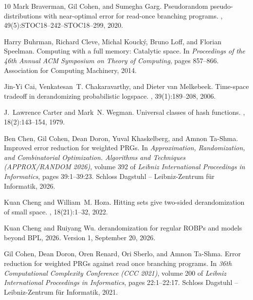 \documentclass[11pt]{article}
\numberwithin{equation}{section}
\theoremstyle{definition}
\theoremstyle{remark}
\begin{document}
\begin{thebibliography}{10}
Mark Braverman, Gil Cohen, and Sumegha Garg.
\newblock Pseudorandom pseudo-distributions with near-optimal error for
  read-once branching programs.
, 49(5):STOC18--242--STOC18--299,
  2020.

Harry Buhrman, Richard Cleve, Michal Kouck{\'y}, Bruno Loff, and Florian
  Speelman.
\newblock Computing with a full memory: Catalytic space.
\newblock In {\em Proceedings of the 46th Annual ACM Symposium on Theory of
  Computing}, pages 857--866. Association for Computing Machinery, 2014.

Jin-Yi Cai, Venkatesan~T. Chakaravarthy, and Dieter van Melkebeek.
\newblock Time-space tradeoff in derandomizing probabilistic logspace.
, 39(1):189--208, 2006.

J.~Lawrence Carter and Mark~N. Wegman.
\newblock Universal classes of hash functions.
, 18(2):143--154, 1979.

Ben Chen, Gil Cohen, Dean Doron, Yuval Khaskelberg, and Amnon Ta-Shma.
\newblock Improved error reduction for weighted {PRGs}.
\newblock In {\em Approximation, Randomization, and Combinatorial Optimization.
  Algorithms and Techniques (APPROX/RANDOM 2026)}, volume 392 of {\em Leibniz
  International Proceedings in Informatics}, pages 39:1--39:23. Schloss
  Dagstuhl -- Leibniz-Zentrum f{\"u}r Informatik, 2026.

Kuan Cheng and William~M. Hoza.
\newblock Hitting sets give two-sided derandomization of small space.
, 18(21):1--32, 2022.

Kuan Cheng and Ruiyang Wu.
 derandomization for regular {ROBPs} and models beyond {BPL},
  2026.
\newblock Version 1, September 20, 2026.

Gil Cohen, Dean Doron, Oren Renard, Ori Sberlo, and Amnon Ta-Shma.
\newblock Error reduction for weighted {PRGs} against read once branching
  programs.
\newblock In {\em 36th Computational Complexity Conference (CCC 2021)}, volume
  200 of {\em Leibniz International Proceedings in Informatics}, pages
  22:1--22:17. Schloss Dagstuhl -- Leibniz-Zentrum f{\"u}r Informatik, 2021.


\end{thebibliography}
\end{document}
